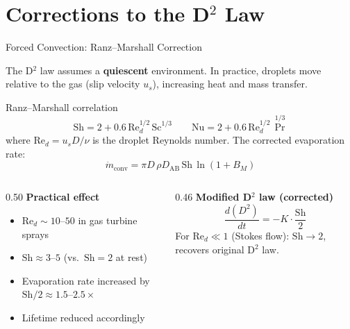 \documentclass[12pt,aspectratio=169]{beamer}
\newcommand{\Rey}{\mathrm{Re}}
\newcommand{\Sh}{\mathrm{Sh}}
\newcommand{\Nu}{\mathrm{Nu}}
\newcommand{\Sc}{\mathrm{Sc}}
\newcommand{\mdot}{\dot{m}}
\newcommand{\BM}{B_M}
\newcommand{\Kd}{K}
\begin{document}
\section{Corrections to the D\texorpdfstring{$^2$}{2} Law}

\begin{frame}{Forced Convection: Ranz--Marshall Correction}

  The D$^2$ law assumes a \textbf{quiescent} environment.
  In practice, droplets move relative to the gas (slip velocity $u_s$),
  increasing heat and mass transfer.

  \begin{block}{Ranz--Marshall correlation}
    \[
      \Sh = 2 + 0.6\,\Rey_d^{1/2}\,\Sc^{1/3}
      \qquad
      \Nu = 2 + 0.6\,\Rey_d^{1/2}\,\Pr^{1/3}
    \]
    where $\Rey_d = u_s D/\nu$ is the droplet Reynolds number.
    The corrected evaporation rate:
    \[
      \mdot_{\text{conv}} = \pi D\,\rho D_{\text{AB}}\,\Sh\,
                            \ln(1+\BM)
    \]
  \end{block}

  \begin{columns}[t]
    \begin{column}{0.50\textwidth}
      \textbf{Practical effect}
      \begin{itemize}
        \item $\Rey_d \sim 10$--$50$ in gas turbine sprays
        \item $\Sh \approx 3$--$5$ (vs.\ $\Sh = 2$ at rest)
        \item Evaporation rate increased by $\Sh/2 \approx 1.5$--$2.5\times$
        \item Lifetime reduced accordingly
      \end{itemize}
    \end{column}
    \begin{column}{0.46\textwidth}
      \textbf{Modified D$^2$ law (corrected)}
      \[
        \frac{d(D^2)}{dt} = -\Kd\cdot\frac{\Sh}{2}
      \]
      For $\Rey_d \ll 1$ (Stokes flow): $\Sh \to 2$, recovers
      original D$^2$ law.
    \end{column}
  \end{columns}
\end{frame}
\end{document}
